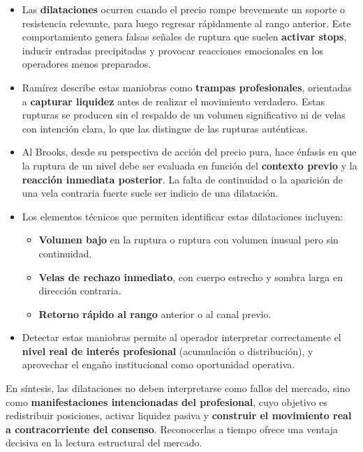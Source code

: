 \begin{itemize}
    \sloppy
    \item Las \textbf{dilataciones} ocurren cuando el precio rompe brevemente un soporte o resistencia relevante, para luego regresar r\'apidamente al rango anterior. Este comportamiento genera falsas se\~nales de ruptura que suelen \textbf{activar stops}, inducir entradas precipitadas y provocar reacciones emocionales en los operadores menos preparados.

    \item Ram\'irez describe estas maniobras como \textbf{trampas profesionales}, orientadas a \textbf{capturar liquidez} antes de realizar el movimiento verdadero. Estas rupturas se producen sin el respaldo de un volumen significativo ni de velas con intenci\'on clara, lo que las distingue de las rupturas aut\'enticas.

    \item Al Brooks, desde su perspectiva de acci\'on del precio pura, hace \'enfasis en que la ruptura de un nivel debe ser evaluada en funci\'on del \textbf{contexto previo} y la \textbf{reacci\'on inmediata posterior}. La falta de continuidad o la aparici\'on de una vela contraria fuerte suele ser indicio de una dilataci\'on.

    \item Los elementos t\'ecnicos que permiten identificar estas dilataciones incluyen:
    \begin{itemize}
        \item \textbf{Volumen bajo} en la ruptura o ruptura con volumen inusual pero sin continuidad.
        \item \textbf{Velas de rechazo inmediato}, con cuerpo estrecho y sombra larga en direcci\'on contraria.
        \item \textbf{Retorno r\'apido al rango} anterior o al canal previo.
    \end{itemize}

    \item Detectar estas maniobras permite al operador interpretar correctamente el \textbf{nivel real de inter\'es profesional} (acumulaci\'on o distribuci\'on), y aprovechar el enga\~no institucional como oportunidad operativa.
\end{itemize}

\noindent
En s\'intesis, las dilataciones no deben interpretarse como fallos del mercado, sino como \textbf{manifestaciones intencionadas del profesional}, cuyo objetivo es redistribuir posiciones, activar liquidez pasiva y \textbf{construir el movimiento real a contracorriente del consenso}. Reconocerlas a tiempo ofrece una ventaja decisiva en la lectura estructural del mercado.


